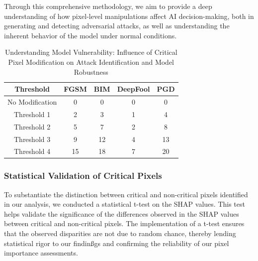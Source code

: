 \documentclass[10pt, conference, a4paper, final]{IEEEtran}
\begin{document}
Through this comprehensive methodology, we aim to provide a deep understanding of how pixel-level manipulations affect AI decision-making, 
both in generating and detecting adversarial attacks, as well as understanding the inherent behavior of the model under normal conditions.
 
        
        
\begin{table}[t]
    \small
    \centering
    \begin{tabular}{|c|c|c|c|c|}
    \hline
    \textbf{Threshold} & \textbf{FGSM} & \textbf{BIM} & \textbf{DeepFool} & \textbf{PGD} \\
    \hline
    No Modification & 0 & 0 & 0 & 0 \\
    \hline
    Threshold 1 & 2 & 3 & 1 & 4 \\
    \hline
    Threshold 2 & 5 & 7 & 2 & 8 \\
    \hline
    Threshold 3 & 9 & 12 & 4 & 13 \\
    \hline
    Threshold 4 & 15 & 18 & 7 & 20 \\
    \hline
    \end{tabular}
    \caption{Understanding Model Vulnerability: Influence of Critical Pixel Modification on Attack Identification and Model Robustness}
    \label{tab:model_robustness_attacks}
    \end{table}
    
\subsubsection{Statistical Validation of Critical Pixels}
To substantiate the distinction between critical and non-critical pixels identified in our analysis, we conducted a statistical t-test on the
 SHAP values. This test helps validate the significance of the differences observed in the SHAP values between critical and non-critical pixels.
  The implementation of a t-test ensures that the observed disparities are not due to random chance, thereby lending statistical rigor to our 
  findinßgs and confirming the reliability of our pixel importance assessments.
\end{document}
